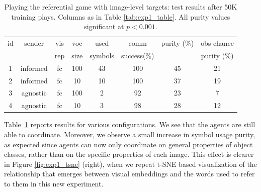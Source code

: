 
\begin{table}[tb]
\centering
\small
\begin{tabular}{c|c|c|c|c|c|c|c}
id &sender   &vis   &voc &used     &comm    &      purity ($\%$)   &obs-chance\\
 &		& rep & size& symbols & success($\%$) &  & purity ($\%$) \\\hline
1&informed&fc      &100     &43          &100               &45         &21\\
2&informed&fc      &10      &10          &100               &37         &19\\
3&agnostic&fc      &100     &2           &92               &23         &7\\
4&agnostic&fc      &10      &3           &98               &28         &12\\
\end{tabular}
\caption{Playing the referential game with image-level targets: test results after 50K training plays. Columns as in Table \ref{tab:exp1_table}. All purity values significant at $p<0.001$.}
\label{tab:exp2_multiinstance}
\end{table}

Table~\ref{tab:exp2_multiinstance} reports results for various
configurations. We see that the agents are still able to
coordinate. Moreover, we observe a small increase in symbol usage
purity, as expected since agents can now only coordinate on general
properties of object classes, rather than on the specific properties
of each image. This effect is clearer in Figure \ref{fig:exp1_tsne} (right), when we repeat t-SNE based visualization of the relationship that emerges between visual embeddings and the words used to refer to them in this new experiment. 

